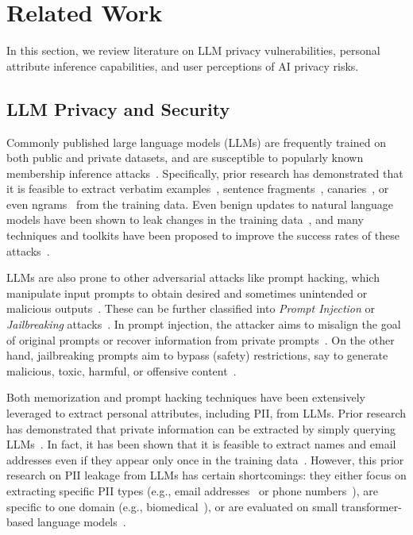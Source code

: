 \section{Related Work}
In this section, we review literature on LLM privacy vulnerabilities, personal attribute inference capabilities, and user perceptions of AI privacy risks.

\subsection{LLM Privacy and Security}
Commonly published large language models (LLMs) are frequently trained on both public and private datasets, and are susceptible to popularly known membership inference attacks~\cite{shokri2017membership}. Specifically, prior research has demonstrated that it is feasible to extract verbatim examples~\cite{carlini2021extracting}, sentence fragments~\cite{inan2021training}, canaries~\cite{Parikh2022}, or even ngrams~\cite{mccoy-etal-2023-much} from the training data. Even benign updates to natural language models have been shown to leak changes in the training data~\cite{zanella2020ccs}, and many techniques and toolkits have been proposed to improve the success rates of these attacks~\cite{carlini2022membership,carlini2023quantifying,mireshghallah-etal-2022-quantifying, li2024vldb}. 

LLMs are also prone to other adversarial attacks like prompt hacking, which manipulate input prompts to obtain desired and sometimes unintended or malicious outputs~\cite{crothers2023machine}. These can be further classified into \textit{Prompt Injection} or \textit{Jailbreaking} attacks~\cite{das2025security}. In prompt injection, the attacker aims to misalign the goal of original prompts or recover information from private prompts~\cite{perez2022ignore}. On the other hand, jailbreaking prompts aim to bypass (safety) restrictions, say to generate malicious, toxic, harmful, or offensive content~\cite{liu2023jailbreaking}. 

Both memorization and prompt hacking techniques have been extensively leveraged to extract personal attributes, including PII, from LLMs. Prior research has demonstrated that private information can be extracted by simply querying LLMs~\cite{lukas2023analyzing, li-etal-2023-multi-step}. In fact, it has been shown that it is feasible to extract names and email addresses even if they appear only once in the training data~\cite{carlini2021extracting}. However, this prior research on PII leakage from LLMs has certain shortcomings: they either focus on extracting specific PII types (e.g., email addresses~\cite{huang-etal-2022-large} or phone numbers~\cite{nakka2024pii}), are specific to one domain (e.g., biomedical~\cite{nakamura2020kart}), or are evaluated on small transformer-based language models~\cite{Siwon2023propile, inan2021training}.

